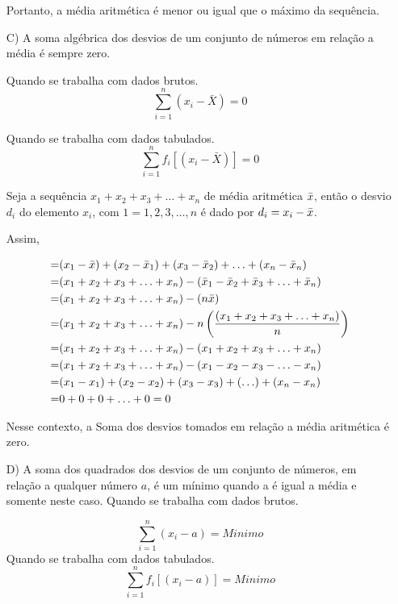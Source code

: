 \begin{enumerate}
Portanto, a média aritmética é menor ou igual que o máximo da sequência.



\item [{C)}] A soma algébrica dos desvios de um conjunto de números em relação a média é sempre zero.\vskip0.3cm

Quando se trabalha com dados brutos.
$$ \sum_{i=1}^{n}(x_{i}-\bar{X})=0 $$


Quando se trabalha com dados tabulados.
$$ \sum_{i=1}^{n}f_{i}[(x_{i}-\bar{X})]=0 $$



\textbf{} 
\vskip0.3cm

Seja a sequência  $x_{1}+x_{2}+x_{3}+\ldots+x_{n}$ de média aritmética $\Bar{x}$, então o desvio $d_{i}$ do elemento $x_{i}$, com $1=1,2,3,\ldots,n$ é dado por $d_{i}=x_{i}-\Bar{x}$.
\vskip0.3cm


Assim, 

\begin{eqnarray*}
= & (x_{1}-\Bar{x})+(x_{2}-\Bar{x}_{1})+(x_{3}-\Bar{x}_{2})+\ldots+(x_{n}-\Bar{x}_{n}) \\
= & (x_{1}+x_{2}+x_{3}+\ldots+x_{n}) - (\Bar{x}_{1}-\Bar{x}_{2}+\Bar{x}_{3}+\ldots+\Bar{x}_{n})\\
= & (x_{1}+x_{2}+x_{3}+\ldots+x_{n})-(n\Bar{x})\\
= & (x_{1}+x_{2}+x_{3}+\ldots+x_{n})-n \left(\frac{(x_{1}+x_{2}+x_{3}+\ldots+x_{n})}{n} \right)\\
= & (x_{1}+x_{2}+x_{3}+\ldots+x_{n})-(x_{1}+x_{2}+x_{3}+\ldots+x_{n})\\
= & (x_{1}+x_{2}+x_{3}+\ldots+x_{n})-(x_{1}-x_{2}-x_{3}-\ldots-x_{n})\\
= & (x_{1}-x_{1})+(x_{2}-x_{2})+(x_{3}-x_{3})+(\ldots)+(x_{n}-x_{n})\\
= & 0+0+0+\ldots+0=0
\end{eqnarray*}

Nesse contexto, a Soma dos desvios tomados em relação a média aritmética é zero.




\newpage

\item [{D)}] A soma dos quadrados dos desvios de um conjunto de números, em relação a qualquer número $a$, é um mínimo quando a é igual a média e somente neste caso.\vskip0.3cm
Quando se trabalha com dados brutos.

$$ \sum_{i=1}^{n}(x_{i}- a)= Minimo  $$
Quando se trabalha com dados tabulados.
$$ \sum_{i=1}^{n}f_{i}[(x_{i}- a)]= Minimo  $$


\end{enumerate}
